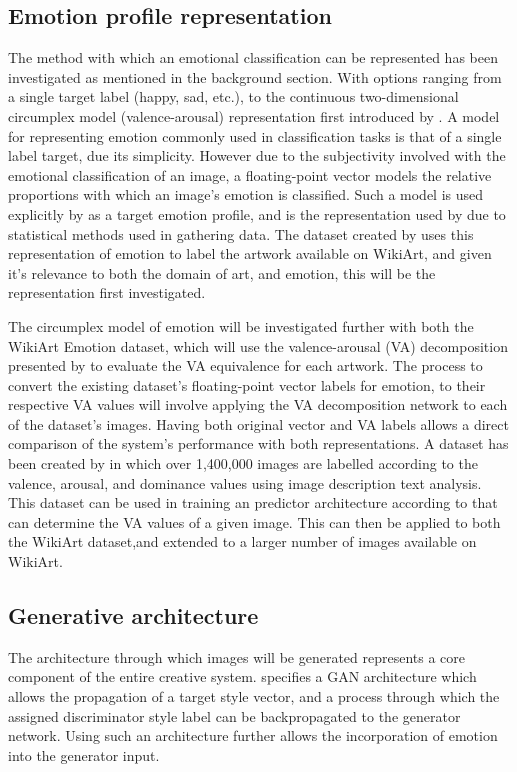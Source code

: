 \documentclass{article}
\begin{document}
\subsection{Emotion profile representation}
The method with which an emotional classification can be represented has been investigated as mentioned in the background section.
With options ranging from a single target label (happy, sad, etc.), to the continuous two-dimensional circumplex model (valence-arousal) representation first introduced by \citet{russell1980circumplex}.
A model for representing emotion commonly used in classification tasks is that of a single label target, due its simplicity.
However due to the subjectivity involved with the emotional classification of an image, a floating-point vector models the relative proportions with which an image's emotion is classified.
Such a model is used explicitly by \citet{ali2017emotional} as a target emotion profile, and is the representation used by \citep{mohammad2018wikiart} due to statistical methods used in gathering data.
The dataset created by \citet{mohammad2018wikiart} uses this representation of emotion to label the artwork available on WikiArt, and given it's relevance to both the domain of art, and emotion, this will be the representation first investigated.

The circumplex model of emotion will be investigated further with both the WikiArt Emotion dataset, which will use the valence-arousal (VA) decomposition presented by \citet{kim2018building} to evaluate the VA equivalence for each artwork.
The process to convert the existing dataset's floating-point vector labels for emotion, to their respective VA values will involve applying the VA decomposition network to each of the dataset's images.
Having both original vector and VA labels allows a direct comparison of the system's performance with both representations.
A dataset has been created by \citet{zhao2016predicting} in which over 1,400,000 images are labelled according to the valence, arousal, and dominance values using image description text analysis.
This dataset can be used in training an predictor architecture according to \citet{kim2018building} that can determine the VA values of a given image.
This can then be applied to both the WikiArt dataset,and extended to a larger number of images available on WikiArt.

\subsection{Generative architecture}
The architecture through which images will be generated represents a core component of the entire creative system.
\citet{tan2017artgan} specifies a GAN architecture which allows the propagation of a target style vector, and a process through which the assigned discriminator style label can be backpropagated to the generator network.
Using such an architecture further allows the incorporation of emotion into the generator input.
\end{document}
